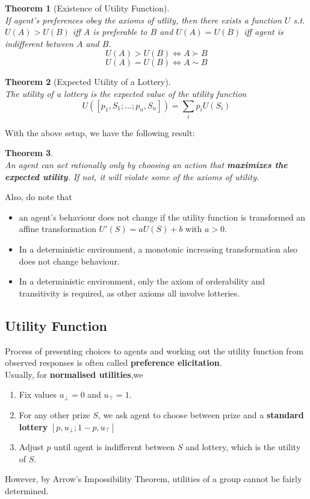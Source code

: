 \documentclass[12pt]{article}
\newtheorem{theorem}{Theorem}[section]
\theoremstyle{definition}
\begin{document}
\begin{theorem}[Existence of Utility Function]
\hfill\\\normalfont If agent's preferences obey the axioms of utlity, then there exists a function $U$ s.t. $U(A)>U(B)$ iff $A$ is preferable to $B$ and $U(A)=U(B)$ iff agent is indifferent between $A$ and $B$.
\[
U(A)>U(B)\Leftrightarrow A\succ B
\]
\[
U(A)=U(B)\Leftrightarrow A\sim B
\]
\end{theorem}
\begin{theorem}[Expected Utility of a Lottery]
\hfill\\\normalfont The utility of a lottery is the expected value of the utility function
\[
U([p_1,S_1; \ldots; p_n, S_n]) = \sum_i p_iU(S_i)
\]
\end{theorem}
With the above setup, we have the following result:
\begin{theorem}
\hfill\\\normalfont An agent can act rationally only by choosing an action that \textbf{maximizes the expected utility}. If not, it will violate some of the axioms of utility.
\end{theorem}
Also, do note that 
\begin{itemize}
\item an agent's behaviour does not change if the utility function is transformed an affine transformation $U'(S)=aU(S)+b$ with $a>0$.\\
\item In a deterministic environment, a monotonic increasing transformation also does not change behaviour.
\item In a deterministic environment, only the axiom of orderability and transitivity is required, as other axioms all involve lotteries.
\end{itemize}
\subsection{Utility Function}
Process of presenting choices to agents and working out the utility function from observed responses is often called \textbf{preference elicitation}.\\
Usually, for \textbf{normalised utilities},we
\begin{enumerate}
	\item Fix values $u_{\bot} = 0$ and $u_{\top} = 1$.
	\item For any other prize $S$, we ask agent to choose between prize and a \textbf{standard lottery} $[p,u_{\bot}; 1-p, u_{\top}]$
	\item Adjust $p$ until agent is indifferent between $S$ and lottery, which is the utility of $S$.
\end{enumerate} 
However, by Arrow's Impossibility Theorem, utilities of a group cannot be fairly determined. 
\end{document}
